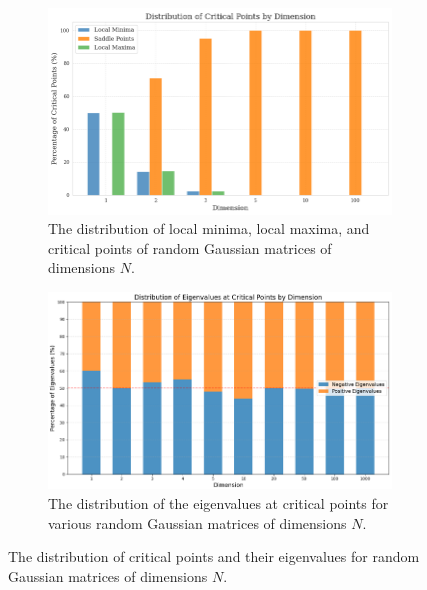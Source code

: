 \begin{figure}[h]
    \begin{subfigure}[b]{0.48\linewidth}
        \centering
        \includegraphics[width=\linewidth]{figures/2background/critical_dist.png}
        \caption{The distribution of local minima, local maxima, and critical points of random Gaussian matrices of dimensions $N$.}
        \label{fig:critical_dist}
    \end{subfigure}
    \hfill
    \begin{subfigure}[b]{0.48\linewidth}
        \centering
        \includegraphics[width=\linewidth]{figures/2background/eigen_dist.png}
        \caption{The distribution of the eigenvalues at critical points for various random Gaussian matrices of dimensions $N$.}
        \label{fig:eigen_dist}
    \end{subfigure}
    \caption{The distribution of critical points and their eigenvalues for random Gaussian matrices of dimensions $N$.}
    \label{fig:high_dim_experiment}
\end{figure}

